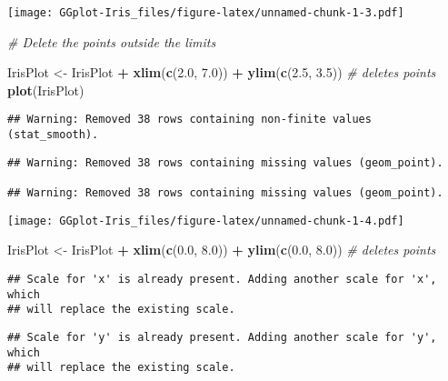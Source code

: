 \documentclass[]{article}
\newenvironment{Shaded}{\begin{snugshade}}{\end{snugshade}}
\newcommand{\KeywordTok}[1]{\textcolor[rgb]{0.13,0.29,0.53}{\textbf{#1}}}
\newcommand{\FloatTok}[1]{\textcolor[rgb]{0.00,0.00,0.81}{#1}}
\newcommand{\StringTok}[1]{\textcolor[rgb]{0.31,0.60,0.02}{#1}}
\newcommand{\CommentTok}[1]{\textcolor[rgb]{0.56,0.35,0.01}{\textit{#1}}}
\newcommand{\OperatorTok}[1]{\textcolor[rgb]{0.81,0.36,0.00}{\textbf{#1}}}
\newcommand{\NormalTok}[1]{#1}
\begin{document}
\texttt{[image: GGplot-Iris\_files/figure-latex/unnamed-chunk-1-3.pdf]}

\begin{Shaded}
\begin{Highlighting}[]
\CommentTok{# Delete the points outside the limits}

\NormalTok{IrisPlot <-}\StringTok{ }\NormalTok{IrisPlot }\OperatorTok{+}\StringTok{ }\KeywordTok{xlim}\NormalTok{(}\KeywordTok{c}\NormalTok{(}\FloatTok{2.0}\NormalTok{, }\FloatTok{7.0}\NormalTok{)) }\OperatorTok{+}\StringTok{ }\KeywordTok{ylim}\NormalTok{(}\KeywordTok{c}\NormalTok{(}\FloatTok{2.5}\NormalTok{, }\FloatTok{3.5}\NormalTok{))   }\CommentTok{#  deletes points}
\KeywordTok{plot}\NormalTok{(IrisPlot)}
\end{Highlighting}
\end{Shaded}

\begin{verbatim}
## Warning: Removed 38 rows containing non-finite values (stat_smooth).
\end{verbatim}

\begin{verbatim}
## Warning: Removed 38 rows containing missing values (geom_point).

## Warning: Removed 38 rows containing missing values (geom_point).
\end{verbatim}

\texttt{[image: GGplot-Iris\_files/figure-latex/unnamed-chunk-1-4.pdf]}

\begin{Shaded}
\begin{Highlighting}[]
\NormalTok{IrisPlot <-}\StringTok{ }\NormalTok{IrisPlot }\OperatorTok{+}\StringTok{ }\KeywordTok{xlim}\NormalTok{(}\KeywordTok{c}\NormalTok{(}\FloatTok{0.0}\NormalTok{, }\FloatTok{8.0}\NormalTok{)) }\OperatorTok{+}\StringTok{ }\KeywordTok{ylim}\NormalTok{(}\KeywordTok{c}\NormalTok{(}\FloatTok{0.0}\NormalTok{, }\FloatTok{8.0}\NormalTok{))   }\CommentTok{#  deletes points}
\end{Highlighting}
\end{Shaded}

\begin{verbatim}
## Scale for 'x' is already present. Adding another scale for 'x', which
## will replace the existing scale.
\end{verbatim}

\begin{verbatim}
## Scale for 'y' is already present. Adding another scale for 'y', which
## will replace the existing scale.
\end{verbatim}
\end{document}

